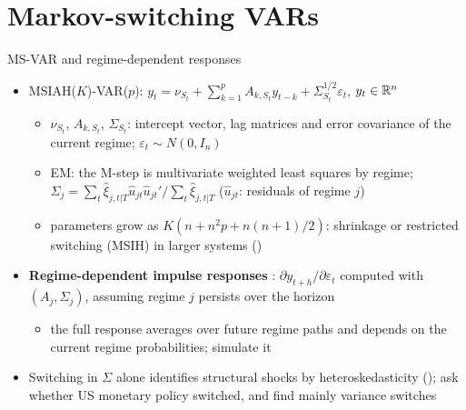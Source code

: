 \section{Markov-switching VARs}

\begin{frame}{MS-VAR and regime-dependent responses}
\itemsize{\small}
\begin{itemize}
    \item MSIAH($K$)-VAR($p$): $y_t = \nu_{S_t} + \sum_{k=1}^p A_{k,S_t}y_{t-k} + \Sigma_{S_t}^{1/2}\varepsilon_t$, $y_t \in \mathbb{R}^n$ 
    \begin{itemize}
        \item $\nu_{S_t}$, $A_{k,S_t}$, $\Sigma_{S_t}$: intercept vector, lag matrices and error covariance of the current regime; $\varepsilon_t \sim N(0, I_n)$
        \item EM: the M-step is multivariate weighted least squares by regime; $\Sigma_j = \sum_t\hat\xi_{j,t|T}\hat u_{jt}\hat u_{jt}'/\sum_t\hat\xi_{j,t|T}$ ($\hat u_{jt}$: residuals of regime $j$)
        \item parameters grow as $K(n + n^2p + n(n + 1)/2)$: shrinkage or restricted switching (MSIH) in larger systems ()
    \end{itemize}
    \item \textbf{Regime-dependent impulse responses} : $\partial y_{t+h}/\partial\varepsilon_t$ computed with $(A_j, \Sigma_j)$, assuming regime $j$ persists over the horizon
    \begin{itemize}
        \item the full response averages over future regime paths and depends on the current regime probabilities; simulate it
    \end{itemize}
    \item Switching in $\Sigma$ alone identifies structural shocks by heteroskedasticity ();  ask whether US monetary policy switched, and find mainly variance switches
\end{itemize}
\end{frame}

